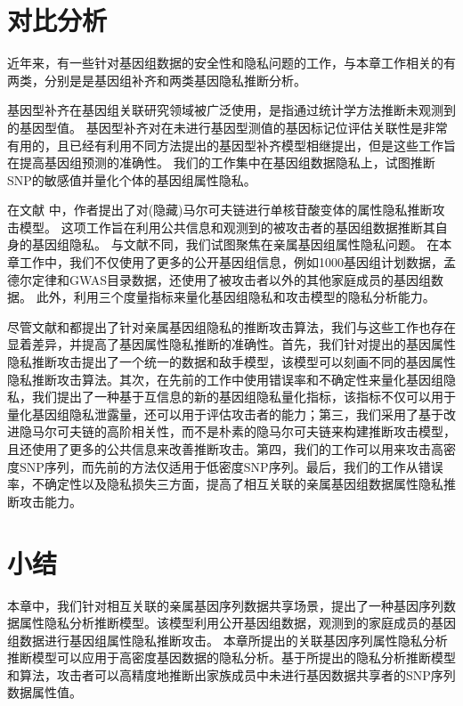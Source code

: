 \section{对比分析}

近年来，有一些针对基因组数据的安全性和隐私问题的工作\cite{hubaux2017genomic}，与本章工作相关的有两类，分别是是基因组补齐和两类基因隐私推断分析。

基因型补齐在基因组关联研究领域被广泛使用\cite{marchini2007newa}，是指通过统计学方法推断未观测到的基因型值。 基因型补齐对在未进行基因型测值的基因标记位评估关联性是非常有用的，且已经有利用不同方法提出的基因型补齐模型相继提出\cite{howie2009flexible,marchini2007newa,howie2014impute2}，但是这些工作旨在提高基因组预测的准确性。 我们的工作集中在基因组数据隐私上，试图推断SNP的敏感值并量化个体的基因组属性隐私。


在文献\cite{samani2015quantifying} 中，作者提出了对(隐藏)马尔可夫链进行单核苷酸变体的属性隐私推断攻击模型。 这项工作旨在利用公共信息和观测到的被攻击者的基因组数据推断其自身的基因组隐私。 与文献\cite{samani2015quantifying}不同，我们试图聚焦在亲属基因组属性隐私问题。 在本章工作中，我们不仅使用了更多的公开基因组信息，例如1000基因组计划数据，孟德尔定律和GWAS目录数据，还使用了被攻击者以外的其他家庭成员的基因组数据。 此外，利用三个度量指标来量化基因组隐私和攻击模型的隐私分析能力。

尽管文献\cite{humbert2013addressing,humbert2017quantifying}和\cite{deznabi2018inference}都提出了针对亲属基因组隐私的推断攻击算法，我们与这些工作也存在显着差异，并提高了基因属性隐私推断的准确性。首先，我们针对提出的基因属性隐私推断攻击提出了一个统一的数据和敌手模型，该模型可以刻画不同的基因属性隐私推断攻击算法。其次，在先前的工作中使用错误率和不确定性来量化基因组隐私，我们提出了一种基于互信息的新的基因组隐私量化指标，该指标不仅可以用于量化基因组隐私泄露量，还可以用于评估攻击者的能力；第三，我们采用了基于改进隐马尔可夫链的高阶相关性，而不是朴素的隐马尔可夫链来构建推断攻击模型，且还使用了更多的公共信息来改善推断攻击。第四，我们的工作可以用来攻击高密度SNP序列，而先前的方法仅适用于低密度SNP序列。最后，我们的工作从错误率，不确定性以及隐私损失三方面，提高了相互关联的亲属基因组数据属性隐私推断攻击能力。

\section{小结}

本章中，我们针对相互关联的亲属基因序列数据共享场景，提出了一种基因序列数据属性隐私分析推断模型。该模型利用公开基因组数据，观测到的家庭成员的基因组数据进行基因组属性隐私推断攻击。 本章所提出的关联基因序列属性隐私分析推断模型可以应用于高密度基因数据的隐私分析。基于所提出的隐私分析推断模型和算法，攻击者可以高精度地推断出家族成员中未进行基因数据共享者的SNP序列数据属性值。




	


	

